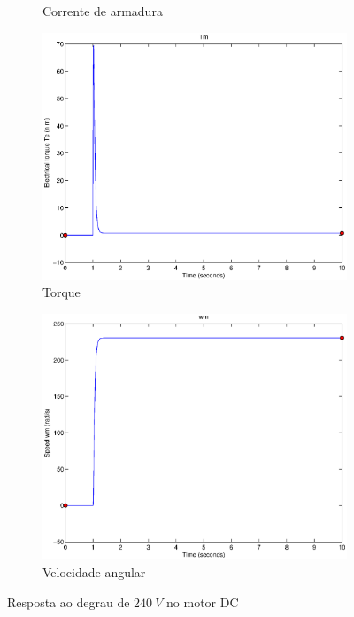 \documentclass{article}
\begin{document}
\begin{figure}[h]
\begin{subfigure}{0.45\textwidth}
		\caption{Corrente de armadura}
	\end{subfigure}
	\begin{subfigure}{0.45\textwidth}
		\includegraphics[width=\linewidth]{matlab/tm1}
		\caption{Torque}
	\end{subfigure}
	\begin{subfigure}{0.45\textwidth}
		\includegraphics[width=\linewidth]{matlab/wm1}
		\caption{Velocidade angular}
	\end{subfigure}
	\caption{Resposta ao degrau de $240\ V$ no motor DC}	
	\label{fig:sim1viwt}
\end{figure}
\end{document}
